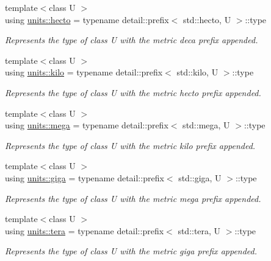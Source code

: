 \begin{DoxyCompactItemize}
{\footnotesize template$<$class U $>$ }\\using \hyperlink{group___unit_manipulators_gaf3fc3cf9567ce9a93f880419c4ddac46}{units\+::hecto} = typename detail\+::prefix$<$ std\+::hecto, U $>$\+::type
\begin{DoxyCompactList}\small\item\em Represents the type of {\ttfamily class U} with the metric \textquotesingle{}deca\textquotesingle{} prefix appended. \end{DoxyCompactList}\item 
{\footnotesize template$<$class U $>$ }\\using \hyperlink{group___unit_manipulators_ga89965a45aaa6689548b9c53858759c5e}{units\+::kilo} = typename detail\+::prefix$<$ std\+::kilo, U $>$\+::type
\begin{DoxyCompactList}\small\item\em Represents the type of {\ttfamily class U} with the metric \textquotesingle{}hecto\textquotesingle{} prefix appended. \end{DoxyCompactList}\item 
{\footnotesize template$<$class U $>$ }\\using \hyperlink{group___unit_manipulators_gab1e685fcf4dd9478ed3d688f7af50842}{units\+::mega} = typename detail\+::prefix$<$ std\+::mega, U $>$\+::type
\begin{DoxyCompactList}\small\item\em Represents the type of {\ttfamily class U} with the metric \textquotesingle{}kilo\textquotesingle{} prefix appended. \end{DoxyCompactList}\item 
{\footnotesize template$<$class U $>$ }\\using \hyperlink{group___unit_manipulators_ga4595911f659ef61133216da15d61eb07}{units\+::giga} = typename detail\+::prefix$<$ std\+::giga, U $>$\+::type
\begin{DoxyCompactList}\small\item\em Represents the type of {\ttfamily class U} with the metric \textquotesingle{}mega\textquotesingle{} prefix appended. \end{DoxyCompactList}\item 
{\footnotesize template$<$class U $>$ }\\using \hyperlink{group___unit_manipulators_ga9f187b866f1123e65db38a5fbd745698}{units\+::tera} = typename detail\+::prefix$<$ std\+::tera, U $>$\+::type
\begin{DoxyCompactList}\small\item\em Represents the type of {\ttfamily class U} with the metric \textquotesingle{}giga\textquotesingle{} prefix appended. \end{DoxyCompactList}\item 

\end{DoxyCompactItemize}
